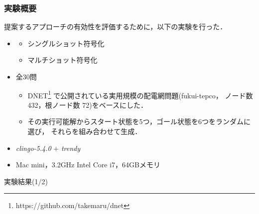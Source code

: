 \documentclass[dvipdfmx,11pt]{beamer}
\begin{document}
\begin{frame}\frametitle{実験概要}
\renewcommand{\thefootnote}{\fnsymbol{footnote}}
\setcounter{footnote}{1}
提案するアプローチの有効性を評価するために，以下の実験を行った．

\begin{itemize}
 \item {}
	   \begin{itemize}
		\item シングルショット符号化
		\item マルチショット符号化
	   \end{itemize}
 \item {} 全30問
	   \begin{itemize}
		\item DNET\footnote{https://github.com/takemaru/dnet}
			  で公開されている実用規模の配電網問題(\textsf{fukui-tepco}，
			  ノード数 432，根ノード数 72)をベースにした．
		\item その実行可能解からスタート状態を5つ，ゴール状態を6つをランダムに選び，
			 それらを組み合わせて生成．
	   \end{itemize}
 \item {} \textit{clingo-5.4.0} $+$ \textit{trendy}
 \item {} Mac mini，3.2GHz Intel Core i7，64GBメモリ
\end{itemize}

\end{frame}

\begin{frame}{実験結果(1/2)}
 \centering
 \scalebox{0.8}{}
\end{frame}

\end{document}
